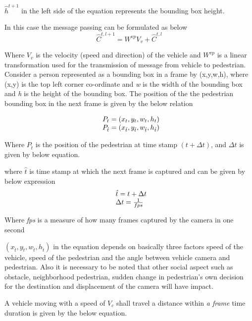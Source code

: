 $ \hat{h}^{t+1}$ in the left side of the equation represents the bounding box height.

In this case the message passing can be formulated as below 
\begin{equation}
\hat{C}^{t, l+1}={W}^{vp}V_v +  \hat{C}^{t, l}
\end{equation}

Where $V_v$ is the velocity (speed and direction) of the vehicle and ${W}^{vp}$ is a linear transformation used for the transmission of message from vehicle to pedestrian.
Consider a person represented as a bounding box in a frame by (x,y,w,h), where (x,y) is the top left corner co-ordinate and \textit{w} is the width of the bounding box and \textit{h} is the height of the bounding box. The position of the the pedestrian bounding box in the next frame is given by the below relation

\begin{equation}
\begin{array}{l@{}}
{P}_{t}=(x_t,y_t,w_t,h_t) \\
{P}_{\hat{t}}=(x_{\hat{t}},y_{\hat{t}},w_{\hat{t}},h_{\hat{t}})
\end{array}
\end{equation}

Where ${P}_{\hat{t}}$ is the position of the pedestrian at time stamp $(t+\Delta t)$, and $\Delta t$ is given by below equation.

where $\hat{t}$ is time stamp at which the next frame is captured and can be given by below expression
\begin{equation}
\begin{array}{l@{}}
\hat{t} = t +  \Delta t \\
\Delta t = \frac{1}{fps}
\end{array}
\end{equation}

Where \textit{fps} is a measure of how many frames captured by the camera in one second

$(x_{\hat{t}},y_{\hat{t}},w_{\hat{t}},h_{\hat{t}})$ in the equation depends on basically three factors speed of the vehicle, speed of the pedestrian and the angle between vehicle camera and pedestrian. Also it is necessary to be noted that other social aspect such as obstacle, neighborhood pedestrian, sudden change in pedestrian's own decision for the destination and displacement of the camera will have impact.

A vehicle moving with a speed of $V_c$ shall travel a distance within \textit{a frame }time duration is given by the below equation.

